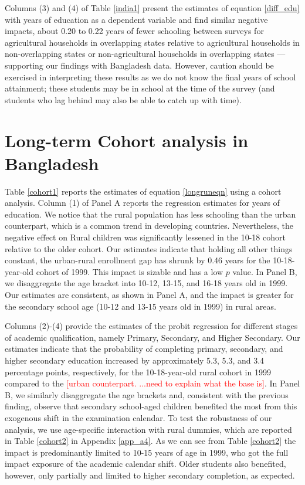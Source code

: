 \documentclass[12pt,letterpaper]{article}\usepackage[margin=1in]{geometry}
\newcommand{\SAdded}[1]{\textcolor{red}{#1}}
\newcommand{\0}{\ensuremath{\mbox{\boldmath $0$}}}
\begin{document}
Columns (3) and (4) of Table \ref{india1} present the estimates of equation \ref{diff_edu} with years of education as a dependent variable and find similar negative impacts, about 0.20 to 0.22 years of fewer schooling between surveys for agricultural households in overlapping states relative to agricultural households in non-overlapping states or non-agricultural households in overlapping states --- supporting our findings with Bangladesh data. However, caution should be exercised in interpreting these results as we do not know the final years of school attainment; these students may be in school at the time of the survey (and students who lag behind may also be able to catch up with time).


\section{Long-term Cohort analysis in Bangladesh\label{sec.long-term}}


Table \ref{cohort1} reports the estimates of equation \eqref{longruneqn} using a cohort analysis. Column (1) of Panel A reports the regression estimates for years of education. We notice that the rural population has less schooling than the urban counterpart, which is a common trend in developing countries. Nevertheless, the negative effect on Rural children was significantly lessened in the 10-18 cohort relative to the older cohort. Our estimates indicate that holding all other things constant, the urban-rural enrollment gap has shrunk by 0.46 years for the 10-18-year-old cohort of 1999. This impact is sizable and has a low $p$ value. In Panel B, we disaggregate the age bracket into 10-12, 13-15, and 16-18 years old in 1999. Our estimates are consistent, as shown in Panel A, and the impact is greater for the secondary school age (10-12 and 13-15 years old in 1999) in rural areas. 


\hfil


Columns (2)-(4) provide the estimates of the probit regression for different stages of academic qualification, namely Primary, Secondary, and Higher Secondary. Our estimates indicate that the probability of completing primary, secondary, and higher secondary education increased by approximately 5.3, 5.3, and 3.4 percentage points, respectively, for the 10-18-year-old rural cohort in 1999 compared to the \SAdded{[urban counterpart. ...need to explain what the base is]}. In Panel B, we similarly disaggregate the age brackets and, consistent with the previous finding, observe that secondary school-aged children benefited the most from this exogenous shift in the examination calendar. To test the robustness of our analysis, we use age-specific interaction with rural dummies, which are reported in Table \ref{cohort2} in Appendix \ref{app_a4}. As we can see from Table \ref{cohort2} the impact is predominantly limited to 10-15 years of age in 1999, who got the full impact exposure of the academic calendar shift. Older students also benefited, however, only partially and limited to higher secondary completion, as expected. 
\end{document}
